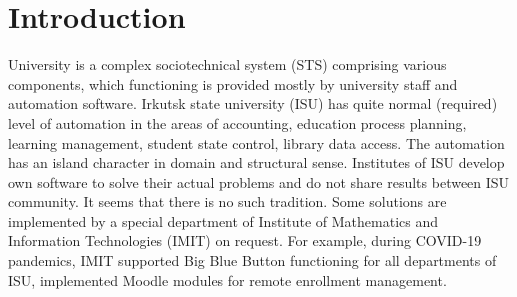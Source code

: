 \documentclass[
]{aiitart}
\begin{document}
\maketitle


\section{Introduction}

University is a complex sociotechnical system (STS) \cite{zh2020} comprising various components, which functioning is provided mostly by university staff and automation software.  Irkutsk state university (ISU) has quite normal (required) level of automation in the areas of accounting, education process planning, learning management, student state control, library data access.  The automation has an island character in domain and structural sense.  Institutes of ISU develop own software to solve their actual problems and do not share results between ISU community. It seems that there is no such tradition.  Some solutions are implemented by a special department of Institute of Mathematics and Information Technologies (IMIT) on request.  For example, during COVID-19 pandemics, IMIT supported Big Blue Button functioning for all departments of ISU, implemented Moodle modules for remote enrollment management.

\end{document}
